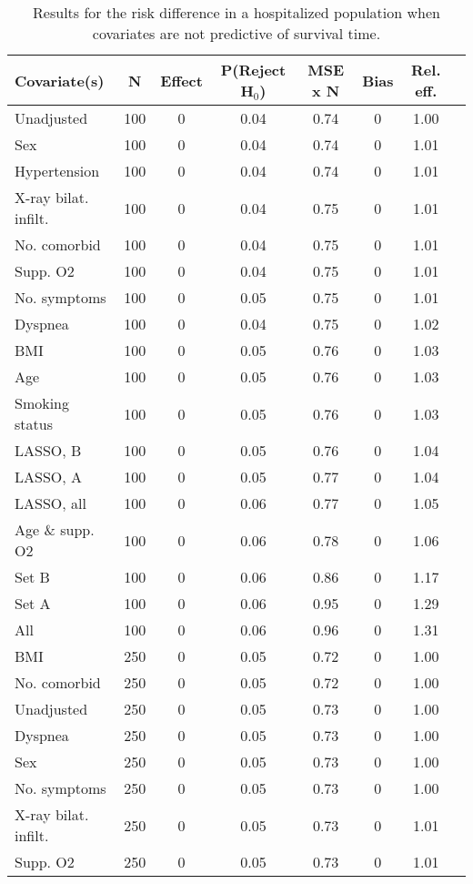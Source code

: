 \documentclass{article}
\begin{document}
{\tabcolsep=6pt  %
\begin{longtable}{lccccccc}
\caption{Results for the risk difference in a hospitalized population when covariates are not predictive of survival time.}\label{tab10}\\
Covariate(s) & N & Effect & P(Reject H$_0$) & MSE x N & Bias & Rel. eff.\\ \midrule
Unadjusted & 100 & 0 & 0.04 & 0.74 & 0 & 1.00\\
Sex & 100 & 0 & 0.04 & 0.74 & 0 & 1.01\\
Hypertension & 100 & 0 & 0.04 & 0.74 & 0 & 1.01\\
X-ray bilat. infilt. & 100 & 0 & 0.04 & 0.75 & 0 & 1.01\\
No. comorbid & 100 & 0 & 0.04 & 0.75 & 0 & 1.01\\
Supp. O2 & 100 & 0 & 0.04 & 0.75 & 0 & 1.01\\
No. symptoms & 100 & 0 & 0.05 & 0.75 & 0 & 1.01\\
Dyspnea & 100 & 0 & 0.04 & 0.75 & 0 & 1.02\\
BMI & 100 & 0 & 0.05 & 0.76 & 0 & 1.03\\
Age & 100 & 0 & 0.05 & 0.76 & 0 & 1.03\\
Smoking status & 100 & 0 & 0.05 & 0.76 & 0 & 1.03\\
LASSO, B & 100 & 0 & 0.05 & 0.76 & 0 & 1.04\\
LASSO, A & 100 & 0 & 0.05 & 0.77 & 0 & 1.04\\
LASSO, all & 100 & 0 & 0.06 & 0.77 & 0 & 1.05\\
Age \& supp. O2 & 100 & 0 & 0.06 & 0.78 & 0 & 1.06\\
Set B & 100 & 0 & 0.06 & 0.86 & 0 & 1.17\\
Set A & 100 & 0 & 0.06 & 0.95 & 0 & 1.29\\
All & 100 & 0 & 0.06 & 0.96 & 0 & 1.31\\ \midrule
BMI & 250 & 0 & 0.05 & 0.72 & 0 & 1.00\\
No. comorbid & 250 & 0 & 0.05 & 0.72 & 0 & 1.00\\
Unadjusted & 250 & 0 & 0.05 & 0.73 & 0 & 1.00\\
Dyspnea & 250 & 0 & 0.05 & 0.73 & 0 & 1.00\\
Sex & 250 & 0 & 0.05 & 0.73 & 0 & 1.00\\
No. symptoms & 250 & 0 & 0.05 & 0.73 & 0 & 1.00\\
X-ray bilat. infilt. & 250 & 0 & 0.05 & 0.73 & 0 & 1.01\\
Supp. O2 & 250 & 0 & 0.05 & 0.73 & 0 & 1.01\\

\end{longtable}}
\end{document}
